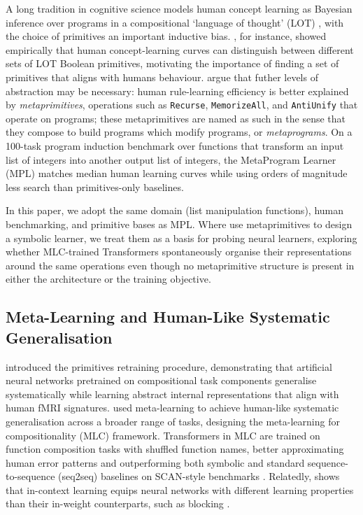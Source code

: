 \documentclass[12pt]{article}
\begin{document}
A long tradition in cognitive science models human concept learning as Bayesian inference over programs in a compositional `language of thought' (LOT) \citep{lake2015human, piantadosi2016logical}, with the choice of primitives an important inductive bias. \citet{piantadosi2016logical}, for instance, showed empirically that human concept-learning curves can distinguish between different sets of LOT Boolean primitives, motivating the importance of finding a set of primitives that aligns with humans behaviour. \citet{rule2024symbolic} argue that futher levels of abstraction may be necessary: human rule-learning efficiency is better explained by \emph{metaprimitives}, operations such as \texttt{Recurse}, \texttt{MemorizeAll}, and \texttt{AntiUnify} that operate on programs; these metaprimitives are named as such in the sense that they compose to build programs which modify programs, or \emph{metaprograms}. On a 100-task program induction benchmark over functions that transform an input list of integers into another output list of integers, the MetaProgram Learner (MPL) matches median human learning curves while using orders of magnitude less search than primitives-only baselines.

In this paper, we adopt the same domain (list manipulation functions), human benchmarking, and primitive bases as MPL. Where \citet{rule2024symbolic} use metaprimitives to design a symbolic learner, we treat them as a basis for probing neural learners, exploring whether MLC-trained Transformers spontaneously organise their representations around the same operations even though no metaprimitive structure is present in either the architecture or the training objective.

\subsection{Meta-Learning and Human-Like Systematic Generalisation}
\label{sec:related-meta-learning}

\citet{ito2022compositional} introduced the primitives retraining procedure, demonstrating that artificial neural networks pretrained on compositional task components generalise systematically while learning abstract internal representations that align with human fMRI signatures. \citet{lake2023human} used meta-learning to achieve human-like systematic generalisation across a broader range of tasks, designing the meta-learning for compositionality (MLC) framework. Transformers in MLC are trained on function composition tasks with shuffled function names, better approximating human error patterns and outperforming both symbolic and standard sequence-to-sequence (seq2seq) baselines on SCAN-style benchmarks \citep{lake2018generalization}. Relatedly, \citet{russin2025dynamic} shows that in-context learning equips neural networks with different learning properties than their in-weight counterparts, such as blocking \citep{beukers2024blocked}.
\end{document}
